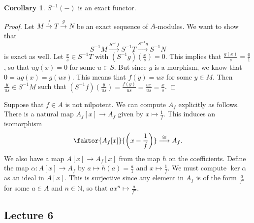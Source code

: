 \documentclass[10pt,letterpaper,cm]{nupset}
\theoremstyle{definition}
\theoremstyle{theorem}
\newtheorem{corollary}[definition]{Corollary}
\theoremstyle{remark}
\newcommand{\N}{\mathbb N}
\newcommand{\1}{\mathbf{1}}
\newcommand{\0}{\vec 0}
\begin{document}
\begin{corollary}
$S^{-1}(-)$ is an exact functor.
\end{corollary}
\begin{proof}
Let $M \overset{f}{\longrightarrow} T \overset{g}{\longrightarrow} N$ be an exact sequence of $A$-modules. We want to show that $$S^{-1}M \overset{S^{-1}f}{\longrightarrow} S^{-1}T \overset{S^{-1}g}{\longrightarrow} S^{-1}N$$ is exact as well. Let $\frac{x}{s} \in S^{-1}T$ with $\left(S^{-1}g\right)\left(\frac{x}{s}\right) = 0$. This implies that $\frac{g(x)}{s} = \frac{0}{1}$, so that $ug(x) = 0$ for some $u\in S$. But since $g$ is a morphism, we know that $0 = ug(x) = g(ux)$. This means that $f(y) = ux$ for some $y\in M$. Then $\frac{y}{us}\in S^{-1}M$ such that $\left(S^{-1}f\right)\left(\frac{y}{us}\right) = \frac{f(y)}{us} = \frac{ux}{us} = \frac{x}{s}$.
\end{proof}

\smallskip

Suppose that $f\in A$ is not nilpotent. We can compute $A_f$ explicitly as follows. There is a natural map $A_f[x] \to A_f$ given by $x \mapsto \frac{1}{f}$. This induces an isomorphism $$\faktor{A_f[x]}{\left(x-\frac{1}{f}\right)} \overset{\cong}{\longrightarrow} A_f.$$ We also have a map $A[x] \to A_f[x]$ from the  map $h$ on the coefficients. Define the map $\alpha: A[x] \to A_f$ by $a \mapsto h(a) = \frac{a}{1}$ and $x\mapsto \frac{1}{f}$. We must compute $\ker{\alpha}$ as an ideal in $A[x]$. This is surjective since any element in $A_f$ is of the form $\frac{a}{f^n}$ for some $a\in A $ and $n\in \N$, so that $ax^n \mapsto \frac{a}{f^n}$.

\subsection{Lecture 6}

\newcommand{\invin}{%
\mathrel{\reflectbox{\rotatebox[origin=c]{270}{$\in$}}}}
\end{document}
